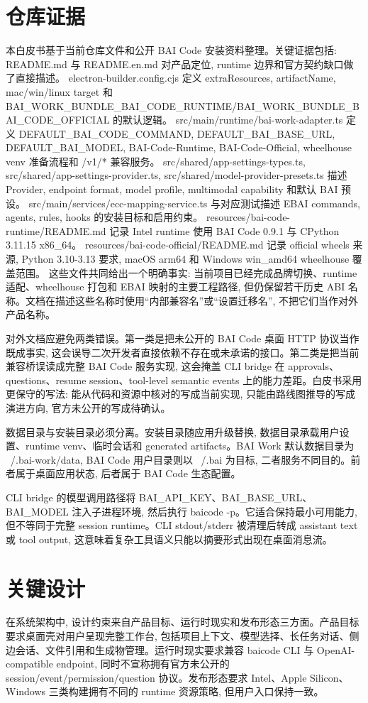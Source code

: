 \section{仓库证据}
本白皮书基于当前仓库文件和公开 BAI Code 安装资料整理。关键证据包括: README.md 与 README.en.md 对产品定位, runtime 边界和官方契约缺口做了直接描述。 electron-builder.config.cjs 定义 extraResources, artifactName, mac/win/linux target 和 BAI\_WORK\_BUNDLE\_BAI\_CODE\_RUNTIME/BAI\_WORK\_BUNDLE\_BAI\_CODE\_OFFICIAL 的默认逻辑。 src/main/runtime/bai-work-adapter.ts 定义 DEFAULT\_BAI\_CODE\_COMMAND, DEFAULT\_BAI\_BASE\_URL, DEFAULT\_BAI\_MODEL, BAI-Code-Runtime, BAI-Code-Official, wheelhouse venv 准备流程和 /v1/* 兼容服务。 src/shared/app-settings-types.ts, src/shared/app-settings-provider.ts, src/shared/model-provider-presets.ts 描述 Provider, endpoint format, model profile, multimodal capability 和默认 BAI 预设。 src/main/services/ecc-mapping-service.ts 与对应测试描述 EBAI commands, agents, rules, hooks 的安装目标和启用约束。 resources/bai-code-runtime/README.md 记录 Intel runtime 使用 BAI Code 0.9.1 与 CPython 3.11.15 x86\_64。 resources/bai-code-official/README.md 记录 official wheels 来源, Python 3.10-3.13 要求, macOS arm64 和 Windows win\_amd64 wheelhouse 覆盖范围。 这些文件共同给出一个明确事实: 当前项目已经完成品牌切换、runtime 适配、wheelhouse 打包和 EBAI 映射的主要工程路径, 但仍保留若干历史 ABI 名称。文档在描述这些名称时使用“内部兼容名”或“设置迁移名”, 不把它们当作对外产品名称。

对外文档应避免两类错误。第一类是把未公开的 BAI Code 桌面 HTTP 协议当作既成事实, 这会误导二次开发者直接依赖不存在或未承诺的接口。第二类是把当前兼容桥误读成完整 BAI Code 服务实现, 这会掩盖 CLI bridge 在 approvals、questions、resume session、tool-level semantic events 上的能力差距。白皮书采用更保守的写法: 能从代码和资源中核对的写成当前实现, 只能由路线图推导的写成演进方向, 官方未公开的写成待确认。

数据目录与安装目录必须分离。安装目录随应用升级替换, 数据目录承载用户设置、runtime venv、临时会话和 generated artifacts。BAI Work 默认数据目录为 ~/.bai-work/data, BAI Code 用户目录则以 ~/.bai 为目标, 二者服务不同目的。前者属于桌面应用状态, 后者属于 BAI Code 生态配置。

CLI bridge 的模型调用路径将 BAI\_API\_KEY、BAI\_BASE\_URL、BAI\_MODEL 注入子进程环境, 然后执行 baicode -p。它适合保持最小可用能力, 但不等同于完整 session runtime。CLI stdout/stderr 被清理后转成 assistant text 或 tool output, 这意味着复杂工具语义只能以摘要形式出现在桌面消息流。

\section{关键设计}
在系统架构中, 设计约束来自产品目标、运行时现实和发布形态三方面。产品目标要求桌面壳对用户呈现完整工作台, 包括项目上下文、模型选择、长任务对话、侧边会话、文件引用和生成物管理。运行时现实要求兼容 baicode CLI 与 OpenAI-compatible endpoint, 同时不宣称拥有官方未公开的 session/event/permission/question 协议。发布形态要求 Intel、Apple Silicon、Windows 三类构建拥有不同的 runtime 资源策略, 但用户入口保持一致。

